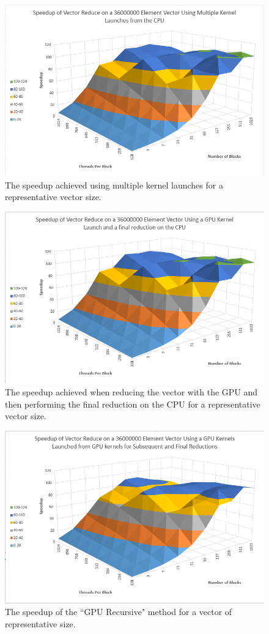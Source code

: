\documentclass{article}
\begin{document}
  \begin{figure}[h!]
    \centering
    \includegraphics[width=.9\linewidth]{multi_kernel_surface}
    \caption{The speedup achieved using multiple kernel launches for a representative vector size.}
    \label{fig:multi_kernel_surface}
  \end{figure}

  \begin{figure}[h!]
    \centering
    \includegraphics[width=.9\linewidth]{cpu_finish_surface}
    \caption{The speedup achieved when reducing the vector with the GPU and then performing the final reduction on the CPU for a representative vector size.}
    \label{fig:cpu_finish_surface}
  \end{figure}

  \begin{figure}[h!]
    \centering
    \includegraphics[width=.7\linewidth]{kernel_in_kernel_surface}
    \caption{The speedup of the ``GPU Recursive" method for a vector of representative size.}
    \label{fig:kernel_in_kernel_surface}
  \end{figure}
\end{document}
